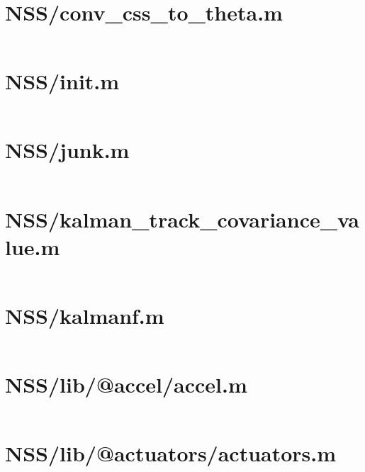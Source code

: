 \pagebreak
\section*{NSS/conv\_css\_to\_theta.m}\label{code:NSS/conv_css_to_theta.m}
\inputminted[linenos,fontsize=\scriptsize]{matlab}{/home/dcouture/git/mathyourlife/TSatPy/beta_versions/matlab_object_oriented/conv_css_to_theta.m}

\pagebreak
\section*{NSS/init.m}\label{code:NSS/init.m}
\inputminted[linenos,fontsize=\scriptsize]{matlab}{/home/dcouture/git/mathyourlife/TSatPy/beta_versions/matlab_object_oriented/init.m}

\pagebreak
\section*{NSS/junk.m}\label{code:NSS/junk.m}
\inputminted[linenos,fontsize=\scriptsize]{matlab}{/home/dcouture/git/mathyourlife/TSatPy/beta_versions/matlab_object_oriented/junk.m}

\pagebreak
\section*{NSS/kalman\_track\_covariance\_value.m}\label{code:NSS/kalman_track_covariance_value.m}
\inputminted[linenos,fontsize=\scriptsize]{matlab}{/home/dcouture/git/mathyourlife/TSatPy/beta_versions/matlab_object_oriented/kalman_track_covariance_value.m}

\pagebreak
\section*{NSS/kalmanf.m}\label{code:NSS/kalmanf.m}
\inputminted[linenos,fontsize=\scriptsize]{matlab}{/home/dcouture/git/mathyourlife/TSatPy/beta_versions/matlab_object_oriented/kalmanf.m}

\pagebreak
\section*{NSS/lib/@accel/accel.m}\label{code:NSS/lib/@accel/accel.m}
\inputminted[linenos,fontsize=\scriptsize]{matlab}{/home/dcouture/git/mathyourlife/TSatPy/beta_versions/matlab_object_oriented/lib/@accel/accel.m}

\pagebreak
\section*{NSS/lib/@actuators/actuators.m}\label{code:NSS/lib/@actuators/actuators.m}
\inputminted[linenos,fontsize=\scriptsize]{matlab}{/home/dcouture/git/mathyourlife/TSatPy/beta_versions/matlab_object_oriented/lib/@actuators/actuators.m}


